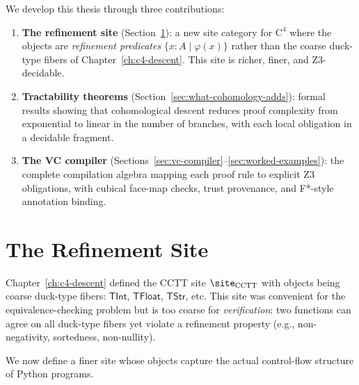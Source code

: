 We develop this thesis through three contributions:

\begin{enumerate}
\item \textbf{The refinement site}
  (Section~\ref{sec:refinement-site}): a new site category for
  $\mathrm{C}^4$ where the objects are \emph{refinement predicates}
  $\{x : A \mid \varphi(x)\}$ rather than the coarse duck-type
  fibers of Chapter~\ref{ch:c4-descent}.  This site is richer,
  finer, and Z3-decidable.

\item \textbf{Tractability theorems}
  (Section~\ref{sec:what-cohomology-adds}): formal results showing
  that cohomological descent reduces proof complexity from
  exponential to linear in the number of branches, with each
  local obligation in a decidable fragment.

\item \textbf{The VC compiler}
  (Sections~\ref{sec:vc-compiler}--\ref{sec:worked-examples}):
  the complete compilation algebra mapping each proof rule to
  explicit Z3 obligations, with cubical face-map checks, trust
  provenance, and F*-style annotation binding.
\end{enumerate}


\section{The Refinement Site}
\label{sec:refinement-site}

Chapter~\ref{ch:c4-descent} defined the CCTT site $\site_\mathrm{CCTT}$
with objects being coarse duck-type fibers: $\mathsf{TInt}$,
$\mathsf{TFloat}$, $\mathsf{TStr}$, etc.  This site was convenient
for the equivalence-checking problem but is too coarse for
\emph{verification}: two functions can agree on all duck-type fibers
yet violate a refinement property (e.g., non-negativity, sortedness,
non-nullity).

We now define a finer site whose objects capture the actual
control-flow structure of Python programs.

